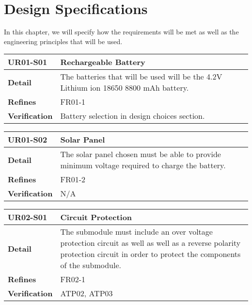 \documentclass[class=report,11pt,crop=false]{standalone}
\begin{document}
 

\section{Design Specifications}

In this chapter, we will specify how the requirements will be met as well as the engineering principles that will be used.

\begin{table}
\centering

\begin{tabular}{| l | l |}
\hline
\textbf{UR01-S01} & \textbf{Rechargeable Battery} \\
\hline
\textbf{Detail} & The batteries that will be used will be the 4.2V Lithium ion 18650 8800 mAh battery.  \\
\hline
\textbf{Refines} & FR01-1 \\
\hline
\textbf{Verification} & Battery selection in design choices section. \\
\hline

\end{tabular}

\end{table}

 

\begin{table}
\centering

\begin{tabular}{| l | l |}
\hline
\textbf{UR01-S02} & \textbf{Solar Panel} \\
\hline
\textbf{Detail} & The solar panel chosen must be able to provide minimum voltage required to charge the battery.  \\
\hline
\textbf{Refines} & FR01-2 \\
\hline
\textbf{Verification} & N/A \\
\hline

\end{tabular}

\end{table}

 

\begin{table}
\centering

\begin{tabular}{| l | l |}
\hline
\textbf{UR02-S01} & \textbf{Circuit Protection} \\
\hline
\textbf{Detail} & The submodule must include an over voltage protection circuit as well as well as a reverse polarity protection circuit in order to protect the components of the submodule.  \\
\hline
\textbf{Refines} & FR02-1 \\
\hline
\textbf{Verification} & ATP02, ATP03 \\
\hline

\end{tabular}

\end{table}
\end{document}
